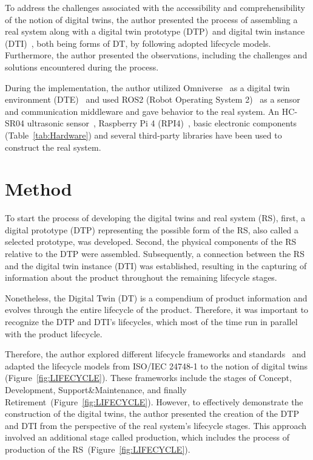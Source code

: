 \documentclass[conference]{IEEEtran}
\begin{document}
    To address the challenges associated with the accessibility and comprehensibility of the notion of digital twins, the author presented the
    process of assembling a real system along with a digital twin prototype (DTP)~\cite{Originsofdigitaltwinconcept}and digital twin instance (DTI)~\cite{Originsofdigitaltwinconcept}, both being forms of DT, 
    by following adopted lifecycle models. Furthermore, the author presented the observations, including the challenges and solutions encountered during the process.

    During the implementation, the author utilized Omniverse~\cite{Omniverse} as a digital twin environment (DTE)~\cite{Originsofdigitaltwinconcept} and used ROS2 (Robot Operating System 2)~\cite{ROS2}
    as a sensor and communication middleware and gave behavior to the real system. An HC-SR04 ultrasonic sensor~\cite{HCSR04}, Raspberry Pi 4 (RPI4)~\cite{RPI4}, 
    basic electronic components (Table~\ref{tab:Hardware}) and several third-party libraries have been used to construct the real system. 

    \section{Method}\label{section:Method}
    To start the process of developing the digital twins and real system (RS), first, a digital prototype (DTP) 
    representing the possible form of the RS, also called a selected prototype, was developed. 
    Second, the physical components of the RS relative to the DTP were assembled. 
    Subsequently, a connection between the RS and the digital twin instance (DTI) was established, 
    resulting in the capturing of information about the product throughout the remaining lifecycle stages.

    Nonetheless, the Digital Twin (DT) is a compendium of product information and evolves through the entire lifecycle of the product. 
    Therefore, it was important to recognize the DTP and DTI's lifecycles, which most of the time run in parallel with the product lifecycle.

    Therefore, the author explored different lifecycle frameworks and standards~\cite{ISO/IEC/IEEE12207,ISO/IEC/IEEE15288,ISO/IEC/IEEE24748-1:2018} and adapted the lifecycle models 
    from ISO/IEC 24748-1 to the notion of digital twins (Figure~\ref{fig:LIFECYCLE}). 
    These frameworks include the stages of  Concept, Development, Support\&Maintenance, and finally Retirement~\cite{ISO/IEC/IEEE24748-1:2018}(Figure~\ref{fig:LIFECYCLE}). 
    However, to effectively demonstrate the construction of the digital twins, the author presented the creation of the DTP and DTI from the perspective of the real system's lifecycle stages. 
    This approach involved an additional stage called production, which includes the process of production of the RS~\cite{ISO/IEC/IEEE24748-1:2018}(Figure~\ref{fig:LIFECYCLE}).
\end{document}
